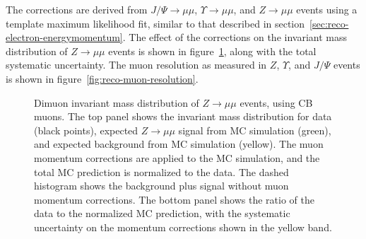 The corrections are derived from $J/\Psi\rightarrow\mu\mu$, $\Upsilon\rightarrow\mu\mu$, and $Z\rightarrow\mu\mu$ events using a template maximum likelihood fit, similar to that described in section~\ref{sec:reco-electron-energymomentum}. The effect of the corrections on the invariant mass distribution of $Z\rightarrow\mu\mu$ events is shown in figure~\ref{fig:reco-muon-momentum-corrections}, along with the total systematic uncertainty. The muon resolution as measured in $Z$, $\Upsilon$, and $J/\Psi$ events is shown in figure~\ref{fig:reco-muon-resolution}.

\begin{figure}[htbp]
	\centering
	\caption{Dimuon invariant mass distribution of $Z\rightarrow\mu\mu$ events, using CB muons. The top panel shows the invariant mass distribution for data (black points), expected $Z\rightarrow\mu\mu$ signal from MC simulation (green), and expected background from MC simulation (yellow). The muon momentum corrections are applied to the MC simulation, and the total MC prediction is normalized to the data. The dashed histogram shows the background plus signal without muon momentum corrections. The bottom panel shows the ratio of the data to the normalized MC prediction, with the systematic uncertainty on the momentum corrections shown in the yellow band.}
	\label{fig:reco-muon-momentum-corrections}
\end{figure}

